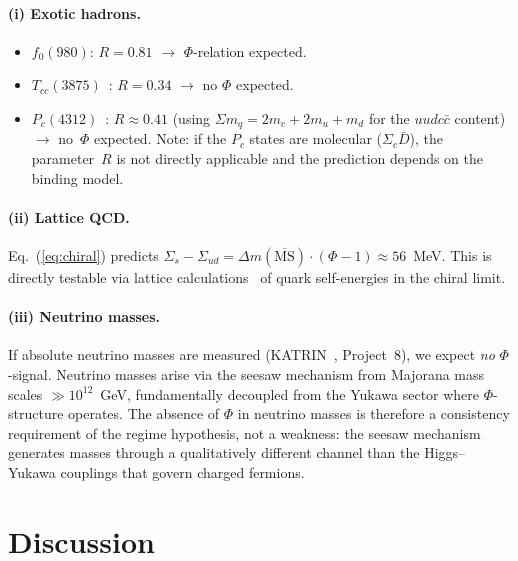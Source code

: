 \documentclass[11pt,a4paper]{article}
\begin{document}
\paragraph{(i) Exotic hadrons.}
\begin{itemize}
  \item $f_0(980)$: $R = 0.81$ $\to$ $\Phi$-relation expected.
  \item $T_{cc}(3875)$~\cite{LHCbTcc2022}: $R = 0.34$ $\to$ no $\Phi$ expected.
  \item $P_c(4312)$~\cite{LHCbPc2019}: $R \approx 0.41$
    (using $\Sigma m_q = 2m_c + 2m_u + m_d$ for the $uudc\bar{c}$
    content) $\to$ no~$\Phi$ expected. Note: if the $P_c$ states are
    molecular ($\Sigma_c \bar{D}$), the parameter~$R$ is not directly
    applicable and the prediction depends on the binding model.
\end{itemize}

\paragraph{(ii) Lattice QCD.}
Eq.~(\ref{eq:chiral}) predicts
$\Sigma_s - \Sigma_{ud} = \Delta m(\overline{\text{MS}}) \cdot
(\Phi - 1) \approx 56$~MeV.
This is directly testable via lattice calculations~\cite{Durr2008,FlavourLattice2022,Borsanyi2021} of quark
self-energies in the chiral limit.

\paragraph{(iii) Neutrino masses.}
If absolute neutrino masses are measured
(KATRIN~\cite{KATRIN2022}, Project~8), we
expect \emph{no} $\Phi$-signal. Neutrino masses arise via the seesaw
mechanism from Majorana mass scales $\gg 10^{12}$~GeV, fundamentally
decoupled from the Yukawa sector where $\Phi$-structure operates.
The absence of $\Phi$ in neutrino masses is therefore a consistency
requirement of the regime hypothesis, not a weakness: the seesaw
mechanism generates masses through a qualitatively different channel
than the Higgs--Yukawa couplings that govern charged fermions.

\section{Discussion}
\label{sec:discussion}
\end{document}
